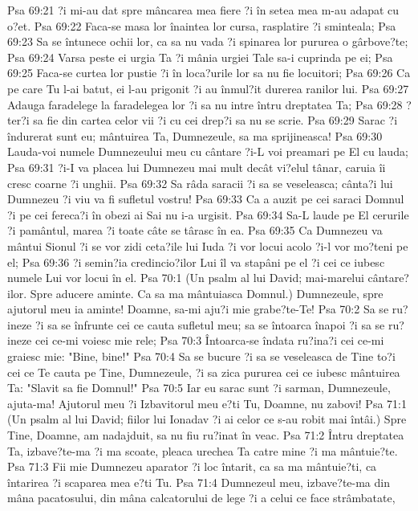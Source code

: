 Psa 69:21  ?i mi-au dat spre mâncarea mea fiere ?i în setea mea m-au adapat cu o?et.
Psa 69:22  Faca-se masa lor înaintea lor cursa, rasplatire ?i sminteala;
Psa 69:23  Sa se întunece ochii lor, ca sa nu vada ?i spinarea lor pururea o gârbove?te;
Psa 69:24  Varsa peste ei urgia Ta ?i mânia urgiei Tale sa-i cuprinda pe ei;
Psa 69:25  Faca-se curtea lor pustie ?i în loca?urile lor sa nu fie locuitori;
Psa 69:26  Ca pe care Tu l-ai batut, ei l-au prigonit ?i au înmul?it durerea ranilor lui.
Psa 69:27  Adauga faradelege la faradelegea lor ?i sa nu intre întru dreptatea Ta;
Psa 69:28  ?ter?i sa fie din cartea celor vii ?i cu cei drep?i sa nu se scrie.
Psa 69:29  Sarac ?i îndurerat sunt eu; mântuirea Ta, Dumnezeule, sa ma sprijineasca!
Psa 69:30  Lauda-voi numele Dumnezeului meu cu cântare ?i-L voi preamari pe El cu lauda;
Psa 69:31  ?i-I va placea lui Dumnezeu mai mult decât vi?elul tânar, caruia îi cresc coarne ?i unghii.
Psa 69:32  Sa râda saracii ?i sa se veseleasca; cânta?i lui Dumnezeu ?i viu va fi sufletul vostru!
Psa 69:33  Ca a auzit pe cei saraci Domnul ?i pe cei fereca?i în obezi ai Sai nu i-a urgisit.
Psa 69:34  Sa-L laude pe El cerurile ?i pamântul, marea ?i toate câte se târasc în ea.
Psa 69:35  Ca Dumnezeu va mântui Sionul ?i se vor zidi ceta?ile lui Iuda ?i vor locui acolo ?i-l vor mo?teni pe el;
Psa 69:36  ?i semin?ia credincio?ilor Lui îl va stapâni pe el ?i cei ce iubesc numele Lui vor locui în el.
Psa 70:1  (Un psalm al lui David; mai-marelui cântare?ilor. Spre aducere aminte. Ca sa ma mântuiasca Domnul.) Dumnezeule, spre ajutorul meu ia aminte! Doamne, sa-mi aju?i mie grabe?te-Te!
Psa 70:2  Sa se ru?ineze ?i sa se înfrunte cei ce cauta sufletul meu; sa se întoarca înapoi ?i sa se ru?ineze cei ce-mi voiesc mie rele;
Psa 70:3  Întoarca-se îndata ru?ina?i cei ce-mi graiesc mie: "Bine, bine!"
Psa 70:4  Sa se bucure ?i sa se veseleasca de Tine to?i cei ce Te cauta pe Tine, Dumnezeule, ?i sa zica pururea cei ce iubesc mântuirea Ta: "Slavit sa fie Domnul!"
Psa 70:5  Iar eu sarac sunt ?i sarman, Dumnezeule, ajuta-ma! Ajutorul meu ?i Izbavitorul meu e?ti Tu, Doamne, nu zabovi!
Psa 71:1  (Un psalm al lui David; fiilor lui Ionadav ?i ai celor ce s-au robit mai întâi.) Spre Tine, Doamne, am nadajduit, sa nu fiu ru?inat în veac.
Psa 71:2  Întru dreptatea Ta, izbave?te-ma ?i ma scoate, pleaca urechea Ta catre mine ?i ma mântuie?te.
Psa 71:3  Fii mie Dumnezeu aparator ?i loc întarit, ca sa ma mântuie?ti, ca întarirea ?i scaparea mea e?ti Tu.
Psa 71:4  Dumnezeul meu, izbave?te-ma din mâna pacatosului, din mâna calcatorului de lege ?i a celui ce face strâmbatate,

